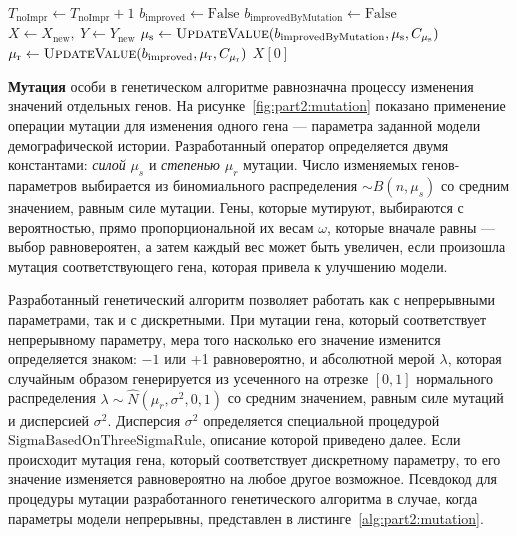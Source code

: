 \begin{algorithm}[ht]
\begin{algorithmic}[1]
    \Else
        \State $T_{\text{noImpr}} \leftarrow T_{\text{noImpr}} + 1$
        \State $b_{\text{improved}} \leftarrow \text{False}$ 
        \State $b_{\text{improvedByMutation}} \leftarrow \text{False}$
    \EndIf
    \State $X \leftarrow X_{\text{new}},\ Y \leftarrow Y_{\text{new}}$
    \State {}
    \State $\mu_\text{s} \leftarrow \Call{UpdateValue}{b_{\text{improvedByMutation}}, \mu_\text{s}, C_{\mu_\text{s}}}$ 
    \State $\mu_\text{r} \leftarrow \Call{UpdateValue}{b_{\text{improved}}, \mu_\text{r}, C_{\mu_\text{r}}}$ %
\EndWhile
\State \Return $X[0]$
\EndFunction
\end{algorithmic}
\end{algorithm}

\FloatBarrier

\textbf{Мутация} особи в генетическом алгоритме равнозначна процессу изменения значений отдельных генов.
На рисунке~\ref{fig:part2:mutation} показано применение операции мутации для изменения одного гена --- параметра заданной модели демографической истории.
Разработанный оператор определяется двумя константами: \textit{силой} $\mu_{s}$ и \textit{степенью} $\mu_{r}$ мутации.
Число изменяемых генов-параметров выбирается из биномиального распределения $\sim B(n, \mu_{s})$ со средним значением, равным силе мутации.
Гены, которые мутируют, выбираются с вероятностью, прямо пропорциональной их весам $\omega$, которые вначале равны --- выбор равновероятен, а затем каждый вес может быть увеличен, если произошла мутация соответствующего гена, которая привела к улучшению модели.

Разработанный генетический алгоритм позволяет работать как с непрерывными параметрами, так и с дискретными.
При мутации гена, который соответствует непрерывному параметру, мера того насколько его значение изменится определяется знаком: $-1$ или +1 равновероятно, и абсолютной мерой $\lambda$, которая случайным образом генерируется из усеченного на отрезке $[0, 1]$ нормального распределения $\lambda \sim \hat{N}(\mu_r, \sigma^2, 0, 1)$ со средним значением, равным силе мутаций и дисперсией $\sigma^2$.
Дисперсия $\sigma^2$ определяется специальной процедурой $\text{SigmaBasedOnThreeSigmaRule}$, описание которой приведено далее.%
Если происходит мутация гена, который соответствует дискретному параметру, то его значение изменяется равновероятно на любое другое возможное.
Псевдокод для процедуры мутации разработанного генетического алгоритма в случае, когда параметры модели непрерывны, представлен в листинге~\ref{alg:part2:mutation}.

